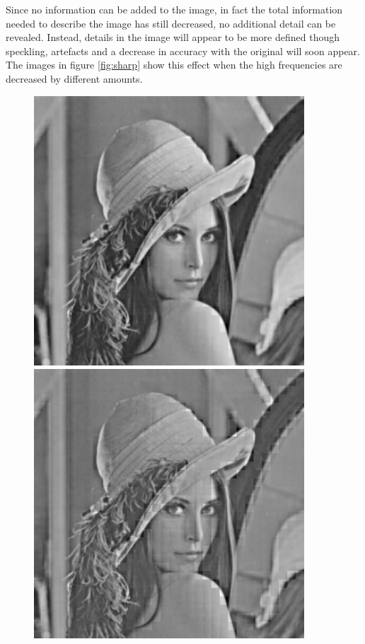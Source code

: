 Since no information can be added to the image, in fact the total information needed to describe the image has still decreased, no additional detail can be revealed. Instead, details in the image will appear to be more defined though speckling, artefacts and a decrease in accuracy with the original will soon appear. The images in figure \ref{fig:sharp} show this effect when the high frequencies are decreased by different amounts.
\begin{figure}[ht]
	\centering
	\begin{minipage}[c]{0.3\linewidth}
		\centering
	 	\includegraphics[width=0.9\textwidth]{lena_sharp1.jpg}
	\end{minipage}
	\begin{minipage}[c]{0.3\linewidth}
		\centering
	 	\includegraphics[width=0.9\textwidth]{lena_sharp2.jpg}

\end{minipage}
\end{figure}
